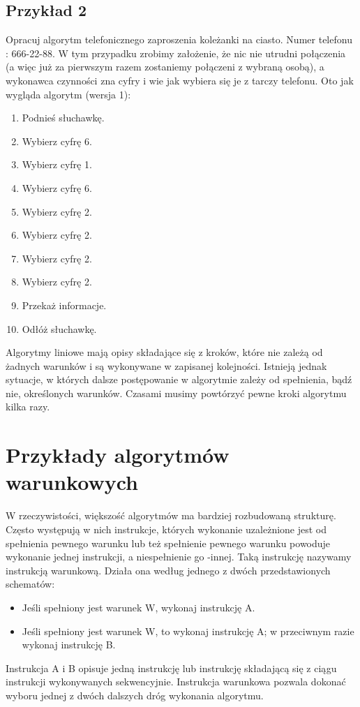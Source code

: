\documentclass[a4paper,11pt]{article}
\begin{document}
\subsection{Przykład 2}
Opracuj algorytm telefonicznego zaproszenia koleżanki na ciasto. Numer telefonu : 
666-22-88. 
W tym przypadku zrobimy założenie, że nic nie utrudni połączenia (a więc już za pierwszym 
razem zostaniemy połączeni z wybraną osobą), a wykonawca czynności zna cyfry i wie 
jak wybiera się je z tarczy telefonu. 
Oto jak wygląda algorytm (wersja 1):
\begin{enumerate}
\item Podnieś słuchawkę. 
\item Wybierz cyfrę 6. 
\item Wybierz cyfrę 1. 
\item Wybierz cyfrę 6. 
\item Wybierz cyfrę 2. 
\item Wybierz cyfrę 2. 
\item Wybierz cyfrę 2. 
\item Wybierz cyfrę 2. 
\item Przekaż informacje. 
\item Odłóż słuchawkę.
\end{enumerate}
Algorytmy liniowe mają opisy składające się z kroków, które nie zależą od żadnych 
warunków i są wykonywane w zapisanej kolejności. Istnieją jednak sytuacje, w których 
dalsze postępowanie w algorytmie zależy od spełnienia, bądź nie, określonych 
warunków. Czasami musimy powtórzyć pewne kroki algorytmu kilka razy. 
\section{Przykłady algorytmów warunkowych}
W rzeczywistości, większość algorytmów ma bardziej rozbudowaną strukturę. 
Często występują w nich instrukcje, których wykonanie uzależnione jest od 
spełnienia pewnego warunku lub też spełnienie pewnego warunku powoduje 
wykonanie jednej instrukcji, a niespełnienie go -innej. Taką instrukcję nazywamy 
instrukcją warunkową. Działa ona według jednego z dwóch przedstawionych 
schematów:
\begin{itemize}
\item Jeśli spełniony jest warunek W, wykonaj instrukcję A. 
\item Jeśli spełniony jest warunek W, to wykonaj instrukcję A; w przeciwnym razie 
wykonaj instrukcję B.
\end{itemize}
Instrukcja A i B opisuje jedną instrukcję lub instrukcję składającą się z ciągu 
instrukcji wykonywanych sekwencyjnie. Instrukcja warunkowa pozwala 
dokonać wyboru jednej z dwóch dalszych dróg wykonania algorytmu.
\newpage
\end{document}
